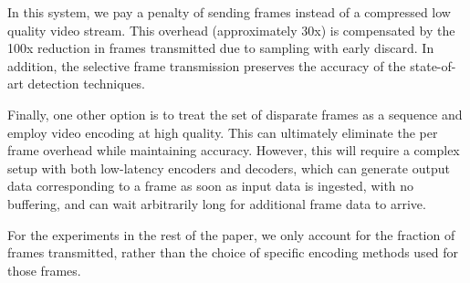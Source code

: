 In this system, we pay a penalty of sending frames instead of a compressed low
quality video stream. This overhead (approximately 30x) is compensated by the
100x reduction in frames transmitted due to sampling with early discard. In
addition, the selective frame transmission preserves the accuracy of the
state-of-art detection techniques.

Finally, one other option is to treat the set of disparate frames as a sequence
and employ video encoding at high quality. This can ultimately eliminate the per
frame overhead while maintaining accuracy. However, this will require a complex setup with
both low-latency encoders and decoders, which can generate output data
corresponding to a frame as soon as input data is ingested, with no buffering,
and can wait arbitrarily long for additional frame data to arrive. 

For the experiments in the rest of the paper, we only account for the fraction
of frames transmitted, rather than the choice of specific encoding methods used
for those frames.



